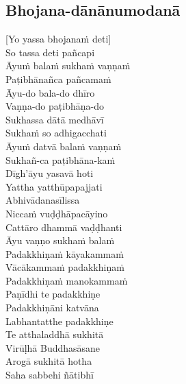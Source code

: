 \suttaRef{[Thai]}

\subsection{Bhojana-dānānumodanā}
\label{bhojana-dananumodana}

[Yo yassa bhojanaṁ deti]\\
So tassa deti pañcapi\\
Āyuṁ balaṁ sukhaṁ vaṇṇaṁ\\
Paṭibhānañca pañcamaṁ\\
Āyu-do bala-do dhīro\\
Vaṇṇa-do paṭibhāṇa-do\\
Sukhassa dātā medhāvī\\
Sukhaṁ so adhigacchati\\
Āyuṁ datvā balaṁ vaṇṇaṁ\\
Sukhañ-ca paṭibhāna-kaṁ\\
Dīgh'āyu yasavā hoti\\
Yattha yatthūpapajjati\\
Abhivādanasīlissa\\
Niccaṁ vuḍḍhāpacāyino\\
Cattāro dhammā vaḍḍhanti\\
Āyu vaṇṇo sukhaṁ balaṁ\\
Padakkhiṇaṁ kāyakammaṁ\\
Vācākammaṁ padakkhiṇaṁ\\
Padakkhiṇaṁ manokammaṁ\\
Paṇīdhi te padakkhiṇe\\
Padakkhiṇāni katvāna\\
Labhantatthe padakkhiṇe\\
Te atthaladdhā sukhitā\\
Virūḷhā Buddhasāsane\\
Arogā sukhitā hotha\\
Saha sabbehi ñātibhī


